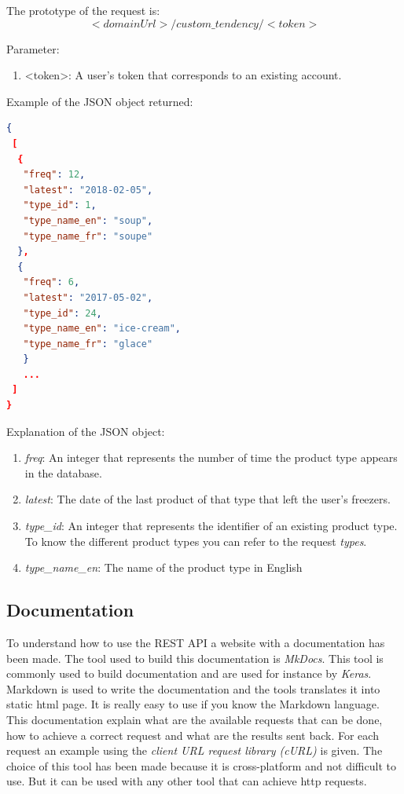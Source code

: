 The prototype of the request is:
$$<domainUrl>/custom\_tendency/<token>$$

Parameter:
\begin{enumerate}
\item <token>: A user's token that corresponds to an existing account.
\end{enumerate}

Example of the JSON object returned:
\begin{lstlisting}[language=json]
{
 [
  {
   "freq": 12, 
   "latest": "2018-02-05", 
   "type_id": 1, 
   "type_name_en": "soup", 
   "type_name_fr": "soupe"
  }, 
  {
   "freq": 6, 
   "latest": "2017-05-02", 
   "type_id": 24, 
   "type_name_en": "ice-cream", 
   "type_name_fr": "glace"
   }
   ...
 ]
}
\end{lstlisting}

Explanation of the  JSON object:
\begin{enumerate}
\item \textit{freq}: An integer that represents the number of time the product type appears in the database.
\item \textit{latest}: The date of the last product of that type that left the user's freezers.
\item \textit{type\_id}: An integer that represents the identifier of an existing product type. To know the different product types you can refer to the request \textit{types}.
\item \textit{type\_name\_en}: The name of the product type in English
\end{enumerate}

\subsection{Documentation}
To understand how to use the REST API a website with a documentation has been made. The tool used to build this documentation is \textit{MkDocs}. This tool is commonly used to build documentation and are used for instance by \textit{Keras}. Markdown is used to write the documentation and the tools translates it into static html page. It is really easy to use if you know the Markdown language. \\

This documentation explain what are the available requests that can be done, how to achieve a correct request and what are the results sent back.
For each request an example using the \textit{client URL request library (cURL)} is given. The choice of this tool has been made because  it is cross-platform and not difficult to use. But it can be used with any other tool that can achieve http requests.

